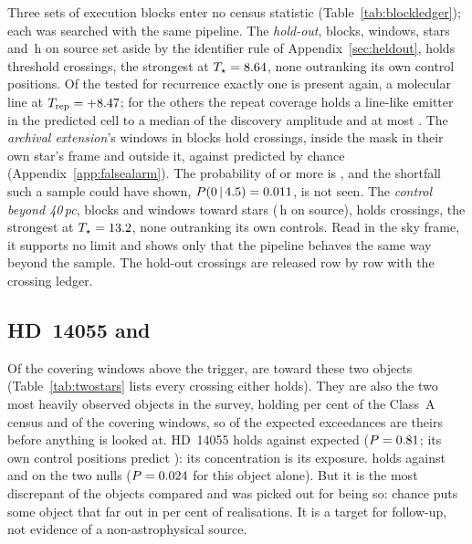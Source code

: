 Three sets of execution blocks enter no census statistic
(Table~\ref{tab:blockledger}); each was searched with the same pipeline. The \emph{hold-out}, \HoNBlock{} blocks,
\HoNWin{} windows, \HoNStar{} stars and \HoHours\,h on source set aside by the
identifier rule of Appendix~\ref{sec:heldout}, holds \HoNCross{} threshold
crossings, the strongest at $T_\star=8.64$, none outranking its own control
positions. Of the \HoNTested{} tested for recurrence exactly one is present
again, a molecular line at $T_{\rm rep}=+8.47$; for the others the repeat
coverage holds a line-like emitter in the predicted cell to a median
\HoFracMed{} of the discovery amplitude and at most \HoFracMax. The
\emph{archival extension}'s \LdgExtWin{} windows in \LdgExtEB{} blocks hold
\QxObsCross{} crossings, \QxObsAttr{} inside the mask in their own star's frame
and \QxObsUnattr{} outside it, against \QxLam{} predicted by chance
(Appendix~\ref{app:falsealarm}). The probability of \QxObsUnattr{} or more is
\QxPGe, and the shortfall such a sample could have shown,
$P(0\,|\,4.5)=0.011$, is not seen. The
\emph{control beyond 40\,pc}, \OosNBlock{} blocks and \OosNWin{} windows toward
\OosNStar{} stars (\OosHours\,h on source), holds \OosNCross{} crossings, the
strongest at $T_\star=13.2$, none outranking its own controls. Read in the sky frame, it supports no limit and shows only that the pipeline behaves the
same way beyond the sample. The hold-out crossings are released row by row
with the crossing ledger.

\subsection{HD~14055 and \BkAlmaName}
\label{sec:twostars}

Of the \WuNWinExc{} covering windows above the trigger, \TwNWinExcTwoWord{}
are toward these two objects (Table~\ref{tab:twostars} lists every crossing
either holds). They are also the two most heavily observed objects in the
survey, holding \TwWinASharePct{} per cent of the Class~A census and
\TwNWinTwo{} of the \WuNWin{} covering windows, so \TwExpTwo{} of the
\WuExpWin{} expected exceedances are theirs before anything is looked at. HD~14055 holds \TwNExcHD{} against
\TwExpHD{} expected ($P=0.81$; its own control positions predict
\TwExpCtrlHD): its concentration is its exposure. \BkAlmaName{} holds
\TwNExcJx{} against \TwExpJx{} and \TwExpCtrlJx{} on the two nulls
($P=0.024$ for this object alone). But it is the most discrepant of the
\TwLookNStar{} objects compared and was picked out for being so: chance puts
some object that far out in \TwLookPct{} per cent of realisations. It is a
target for follow-up, not evidence of a non-astrophysical source.

